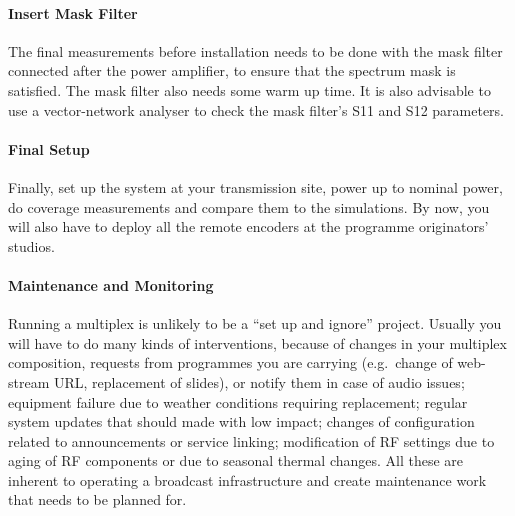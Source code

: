 \paragraph{Insert Mask Filter}
The final measurements before installation needs to be done with the mask
filter connected after the power amplifier, to ensure that the spectrum mask is
satisfied. The mask filter also needs some warm up time.
It is also advisable to use a vector-network analyser to check the
mask filter's S11 and S12 parameters.

\paragraph{Final Setup}
Finally, set up the system at your transmission site, power up to nominal power,
do coverage measurements and compare them to the simulations.
By now, you will also have to deploy all the remote encoders at the programme
originators' studios.

\paragraph{Maintenance and Monitoring}
Running a multiplex is unlikely to be a ``set up and ignore'' project. Usually
you will have to do many kinds of interventions, because of changes in your
multiplex composition, requests from programmes you are carrying (e.g.~change of
web-stream URL, replacement of slides), or notify them in case of audio issues;
equipment failure due to weather conditions requiring replacement; regular
system updates that should made with low impact; changes of configuration
related to announcements or service linking; modification of RF settings due to
aging of RF components or due to seasonal thermal changes. All these are
inherent to operating a broadcast infrastructure and create maintenance work
that needs to be planned for.

